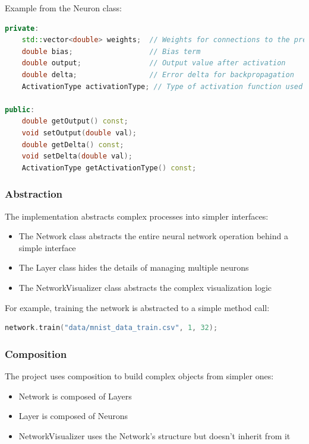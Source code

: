 \documentclass[12pt]{article}
\begin{document}
Example from the Neuron class:
\begin{lstlisting}[language=C++]
private:
    std::vector<double> weights;  // Weights for connections to the previous layer
    double bias;                  // Bias term
    double output;                // Output value after activation
    double delta;                 // Error delta for backpropagation
    ActivationType activationType; // Type of activation function used
    
public:
    double getOutput() const;
    void setOutput(double val);
    double getDelta() const;
    void setDelta(double val);
    ActivationType getActivationType() const;
\end{lstlisting}

\subsubsection{Abstraction}

The implementation abstracts complex processes into simpler interfaces:

\begin{itemize}
    \item The Network class abstracts the entire neural network operation behind a simple interface
    \item The Layer class hides the details of managing multiple neurons
    \item The NetworkVisualizer class abstracts the complex visualization logic
\end{itemize}

For example, training the network is abstracted to a simple method call:
\begin{lstlisting}[language=C++]
network.train("data/mnist_data_train.csv", 1, 32);
\end{lstlisting}

\subsubsection{Composition}

The project uses composition to build complex objects from simpler ones:

\begin{itemize}
    \item Network is composed of Layers
    \item Layer is composed of Neurons
    \item NetworkVisualizer uses the Network's structure but doesn't inherit from it
\end{itemize}
\end{document}
